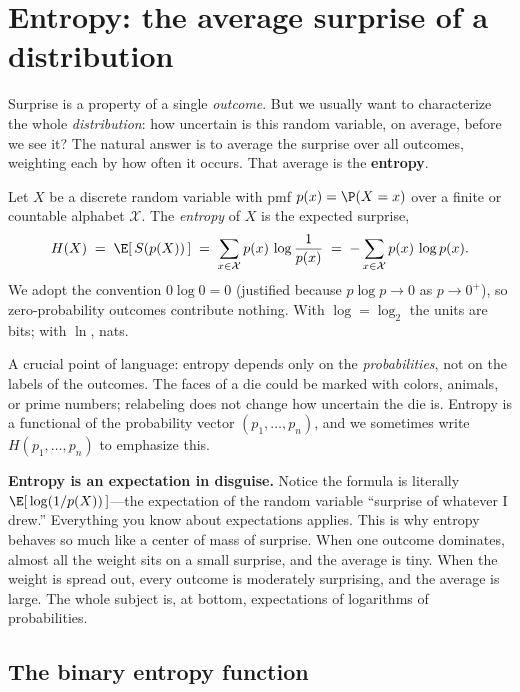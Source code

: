\section{Entropy: the average surprise of a distribution}
\label{ch33:entropy}

Surprise is a property of a single \emph{outcome}. But we usually want to characterize the whole
\emph{distribution}: how uncertain is this random variable, on average, before we see it? The natural
answer is to average the surprise over all outcomes, weighting each by how often it occurs. That average
is the \textbf{entropy}.

\begin{definition}
\label{ch33:def-entropy}
Let $X$ be a discrete random variable with pmf $p(x) = \P(X = x)$ over a finite or countable alphabet
$\mathcal{X}$. The \emph{entropy} of $X$ is the expected surprise,
\[
  H(X) \;=\; \E\!\left[\,S(p(X))\,\right]
        \;=\; \sum_{x \in \mathcal{X}} p(x)\,\log\frac{1}{p(x)}
        \;=\; -\sum_{x \in \mathcal{X}} p(x)\,\log p(x).
\]
We adopt the convention $0\log 0 = 0$ (justified because $p\log p \to 0$ as $p \to 0^+$), so
zero-probability outcomes contribute nothing. With $\log = \log_2$ the units are bits; with $\ln$, nats.
\end{definition}

A crucial point of language: entropy depends only on the \emph{probabilities}, not on the labels of the
outcomes. The faces of a die could be marked with colors, animals, or prime numbers; relabeling does not
change how uncertain the die is. Entropy is a functional of the probability vector $(p_1, \dots, p_n)$,
and we sometimes write $H(p_1, \dots, p_n)$ to emphasize this.

\begin{happeningbox}
\textbf{Entropy is an expectation in disguise.} Notice the formula is literally
$\E[\,\log(1/p(X))\,]$---the expectation of the random variable ``surprise of whatever I drew.'' Everything
you know about expectations applies. This is why entropy behaves so much like a center of mass of
surprise. When one outcome dominates, almost all the weight sits on a small surprise, and the average is
tiny. When the weight is spread out, every outcome is moderately surprising, and the average is large. The
whole subject is, at bottom, expectations of logarithms of probabilities.
\end{happeningbox}

\subsection{The binary entropy function}

